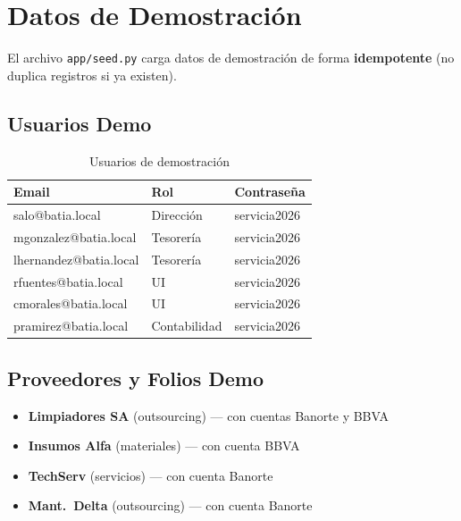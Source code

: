 \documentclass[12pt,a4paper]{article}
\begin{document}
\newpage

\section{Datos de Demostraci\'on}

El archivo \texttt{app/seed.py} carga datos de demostraci\'on de forma
\textbf{idempotente} (no duplica registros si ya existen).

\subsection{Usuarios Demo}

\begin{table}[h!]
\centering
\begin{tabular}{lll}
\toprule
\textbf{Email} & \textbf{Rol} & \textbf{Contrase\~na} \\
\midrule
salo@batia.local        & Direcci\'on   & servicia2026 \\
mgonzalez@batia.local   & Tesorer\'ia   & servicia2026 \\
lhernandez@batia.local  & Tesorer\'ia   & servicia2026 \\
rfuentes@batia.local    & UI            & servicia2026 \\
cmorales@batia.local    & UI            & servicia2026 \\
pramirez@batia.local    & Contabilidad  & servicia2026 \\
\bottomrule
\end{tabular}
\caption{Usuarios de demostraci\'on}
\end{table}

\subsection{Proveedores y Folios Demo}

\begin{itemize}
  \item \textbf{Limpiadores SA} (outsourcing) --- con cuentas Banorte y BBVA
  \item \textbf{Insumos Alfa} (materiales) --- con cuenta BBVA
  \item \textbf{TechServ} (servicios) --- con cuenta Banorte
  \item \textbf{Mant.\ Delta} (outsourcing) --- con cuenta Banorte
\end{itemize}
\end{document}

